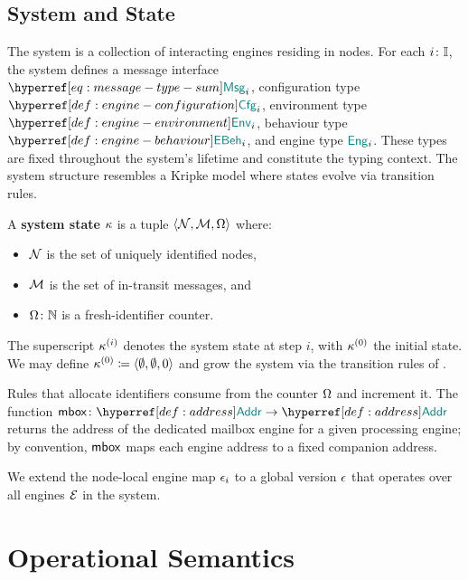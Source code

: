 \documentclass[
  a4paper,        %
  techreport,     %
]{art}
\begin{document}
\subsection{System and State}\label{sec:system}%

The system is a collection of interacting engines residing in nodes. For each
$i\colon\mathbb{I}$, the system defines a message interface $\msgtype{i}$,
configuration type $\configtype{i}$, environment type $\envtype{i}$, behaviour
type $\behaviourtype{i}$, and engine type ${\color{teal}\mathsf{\mathsf{Eng}}}_{i}$. These types are
fixed throughout the system's lifetime and constitute the typing context.
The system structure resembles a Kripke model where states evolve via
transition rules.

\begin{definition}\label{def:state}%
A \textbf{system state} $\kappa$ is a tuple
$ \langle \mathcal{N}, \mathcal{M}, \Omega \rangle $ where:
\begin{itemize}
\item $\mathcal{N}$ is the set of uniquely identified nodes,
\item $\mathcal{M}$ is the set of in-transit messages, and
\item $\Omega\colon\mathbb{N}$ is a fresh-identifier counter.
\end{itemize}
\end{definition}

The superscript $\kappa^{(i)}$ denotes the system state at step $i$,
with $\kappa^{(0)}$ the initial state. We may define
$\kappa^{(0)} \coloneqq  \langle \emptyset, \emptyset, 0 \rangle $
and grow the system via the transition rules of .

Rules that allocate identifiers consume from the counter $\Omega$ and
increment it. The function
$\typing{\mailboxOfname}{\Address \to \Address}$ returns the address
of the dedicated mailbox engine for a given processing engine; by convention,
$\mathsf{mbox}$ maps each engine address to a fixed companion address.

We extend the node-local engine map $\epsilon_i$ to a global version
$\epsilon$ that operates over all engines $\mathcal{E}$ in the system.

\section{Operational Semantics}\label{sec:semantics}
\end{document}
